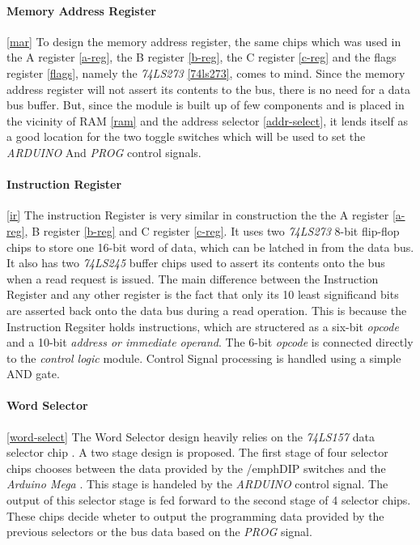  

 \paragraph{Memory Address Register} \ref{mar}
 To design the memory address register, the same chips which was used in the A register \ref{a-reg}, the B register \ref{b-reg},
 the C register \ref{c-reg} and the flags register \ref{flags}, namely the \emph{74LS273}
 \ref{74ls273}, comes to mind. Since the memory address register will not assert its contents to the bus, there is no need for
 a data bus buffer. But, since the module is built up of few components and is placed in the vicinity of RAM \ref{ram} and the
 address selector \ref{addr-select}, it lends itself as a good location for the two toggle switches which will be used to
 set the \emph{ARDUINO} And \emph{PROG} control signals.

 

 \paragraph{Instruction Register} \ref{ir}
 The instruction Register is very similar in construction the the A register \ref{a-reg}, B register \ref{b-reg} and C register
 \ref{c-reg}. It uses two \emph{74LS273} \cite{74ls273} 8-bit flip-flop chips to store one 16-bit word of data, which can be
 latched in from the data bus. It also has two \emph{74LS245} buffer chips used to assert its contents onto the bus when a read
 request is issued. The main difference between the Instruction Register and any other register is the fact that only its 10
 least significand bits are asserted back onto the data bus during a read operation. This is because the Instruction Regsiter
 holds instructions, which are structered as a six-bit \emph{opcode} and a 10-bit \emph{address or immediate operand}. The 6-bit
 \emph{opcode} is connected directly to the \emph{control logic} module. Control Signal processing is handled using a simple
 AND gate.

 

 \paragraph{Word Selector} \ref{word-select}
 The Word Selector design heavily relies on the \emph{74LS157} data selector chip \cite{74ls157}. A two stage design is proposed.
 The first stage of four selector chips chooses between the data provided by the /emph{DIP switches} and the \emph{Arduino Mega}
 \cite{arduino2020mega}. This stage is handeled by the \emph{ARDUINO} control signal. The output of this selector stage is fed
 forward to the second stage of 4 selector chips. These chips decide wheter to output the programming data provided by the
 previous selectors or the bus data based on the \emph{PROG} signal.


